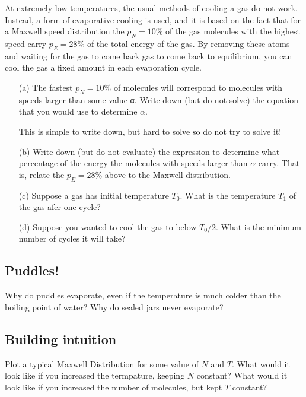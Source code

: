\documentclass{article}
\begin{document}
At extremely low temperatures, the usual methods of cooling a gas
do not work. Instead, a form of evaporative cooling is used, and it is
based on the fact that for a Maxwell speed distribution the $p_N = 10\%$
of the gas molecules with the highest speed carry $p_E = 28\%$ of the total
energy of the gas. By removing these atoms and waiting for the gas
to come back gas to come back to equilibrium, you can cool the gas a
fixed amount in each evaporation cycle.
\begin{itemize}
	\item[(a)] The fastest $p_N = 10\%$ of molecules will correspond to molecules
with speeds larger than some value α. Write down (but do not
solve) the equation that you would use to determine $\alpha$.

This is simple to write down, but hard to solve so do not try to
solve it!
	\item[(b)] Write down (but do not evaluate) the expression to determine
what percentage of the energy the molecules with speeds larger
than $\alpha$ carry. That is, relate the $p_E = 28\%$ above to the Maxwell
distribution.
	\item[(c)] Suppose a gas has initial temperature $T_0$. What is the temperature $T_1$ of the gas afer one cycle?
	\item[(d)] Suppose you wanted to cool the gas to below $T_0/2$. What is the minimum number of cycles it will take?
\end{itemize}

\subsection{Puddles!}

Why do puddles evaporate, even if the temperature is much colder than the boiling point of water? Why do sealed jars never evaporate?

\subsection{Building intuition}

Plot a typical Maxwell Distribution for some value of $N$ and $T$. What would it look like if you increased the termpature, keeping $N$ constant? What would it look like if you increased the number of molecules, but kept $T$ constant?
\end{document}
